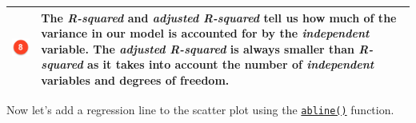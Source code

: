 \documentclass[]{article}
\theoremstyle{definition}
\theoremstyle{definition}
\theoremstyle{definition}
\theoremstyle{remark}
\begin{document}
\begin{longtable}[]{@{}ll@{}}
\begin{minipage}[t]{0.08\columnwidth}
\includegraphics[width=1.00000\textwidth]{./img/circle8.png}\strut
\end{minipage} & \begin{minipage}[t]{0.86\columnwidth}\raggedright\strut
The \emph{R-squared} and \emph{adjusted R-squared} tell us how much of
the variance in our model is accounted for by the \emph{independent}
variable. The \emph{adjusted R-squared} is always smaller than
\emph{R-squared} as it takes into account the number of
\emph{independent} variables and degrees of freedom.\strut
\end{minipage}\tabularnewline
\bottomrule
\end{longtable}

Now let's add a regression line to the scatter plot using the
\href{http://bit.ly/R_abline}{\texttt{abline()}} function.
\end{document}
